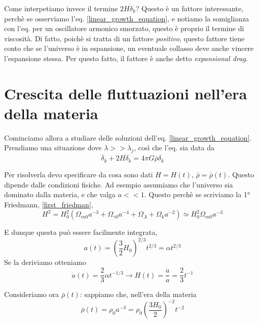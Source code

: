 \documentclass{report}
\begin{document}
Come interpetiamo invece il termine $2H\dot{\delta}_k$? Questo è un fattore interessante, perchè se osserviamo l'eq. \ref{linear_growth_equation}, e notiamo la somiglianza con l'eq. per un oscillatore armonico smorzato, questo è proprio il termine di viscosità. Di fatto, poichè si tratta di un fattore \emph{positivo}, questo fattore tiene conto che se l'universo è in espansione, un eventuale collasso deve anche vincere l'espansione stessa. Per questo fatto, il fattore è anche detto \emph{expansional drag}. \\

\section{Crescita delle fluttuazioni nell'era della materia}

Cominciamo allora a studiare delle soluzioni dell'eq. \ref{linear_growth_equation}. Prendiamo una situazione dove $\lambda >> \lambda_j$, così che l'eq. sia data da 
\begin{equation}
    \ddot{\delta}_k + 2H\dot{\delta}_k = 4\pi G \bar{\rho}\delta_k
\end{equation}

Per risolverla devo specificare da cosa sono dati $H=H(t)$, $\bar{\rho}= \bar{\rho}(t)$. Questo dipende dalle condizioni fisiche. Ad esempio assumiamo che l'universo sia dominato dalla materia, e che valga $a <<1$. Questo perchè se scriviamo la 1° Friedmann, \ref{first_friedman}, 
\begin{equation}
    H^2 = H_0^2(\Omega_{m0}a^{-3}+ \Omega_{\gamma 0}a^{-4} + \Omega_{\Lambda} + \Omega_ka^{-2}) \simeq H_0^2\Omega_{m0}a^{-3}
\end{equation}

E dunque questa può essere facilmente integrata, 
\begin{equation}
    a(t) = \left(\frac{3}{2}H_0 \right)^{2/3}t^{2/3} = \alpha t^{2/3}
\end{equation}
Se la deriviamo otteniamo
\begin{equation}
    \dot{a}(t) = \frac{2}{3}\alpha t^{-1/3} \rightarrow H(t) = \frac{\dot{a}}{a} = \frac{2}{3}t^{-1}
\end{equation}

Consideriamo ora $\bar{\rho}(t)$: sappiamo che, nell'era della materia
\begin{equation}
    \bar{\rho}(t) = \rho_0a^{-3} = \rho_0\left(\frac{3H_0}{2} \right)^{-2}t^{-2}
\end{equation}
\end{document}
